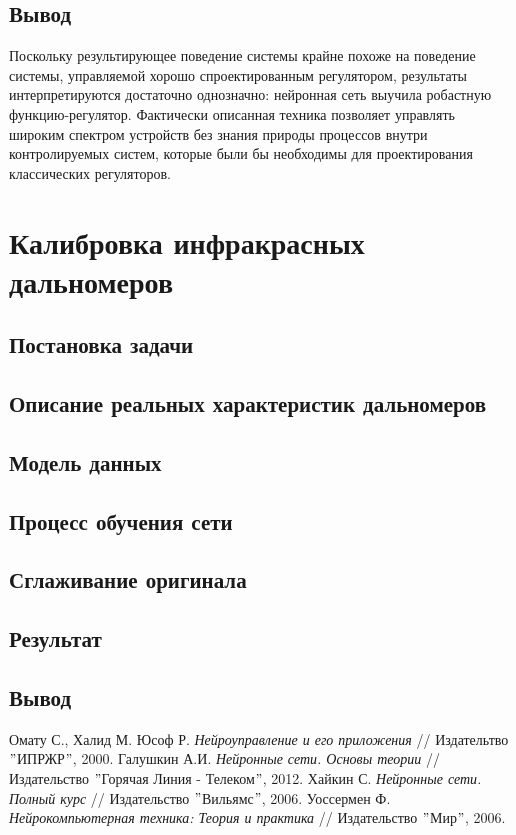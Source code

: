 \documentclass[14pt]{extreport}
\begin{document}
        \section{Вывод}
            Поскольку результирующее поведение системы крайне похоже на поведение системы, управляемой хорошо спроектированным регулятором, результаты интерпретируются достаточно однозначно: нейронная сеть выучила робастную функцию-регулятор. Фактически описанная техника позволяет управлять широким спектром устройств без знания природы процессов внутри контролируемых систем, которые были бы необходимы для проектирования классических регуляторов.
    \chapter{Калибровка инфракрасных дальномеров}
        \section{Постановка задачи}
        \section{Описание реальных характеристик дальномеров}
        \section{Модель данных}
        \section{Процесс обучения сети}
        \section{Сглаживание оригинала}
        \section{Результат}
        \section{Вывод}

\newpage
        \begin{thebibliography}{99}
             Омату С., Халид М. Юсоф Р. {\it Нейроуправление и его приложения} // Издательтво $"$ИПРЖР$"$, 2000.
             Галушкин А.И. {\it Нейронные сети. Основы теории} // Издательство $"$Горячая Линия - Телеком$"$, 2012.
             Хайкин С. {\it Нейронные сети. Полный курс} // Издательство $"$Вильямс$"$, 2006.
             Уоссермен Ф. {\it Нейрокомпьютерная техника: Теория и практика} // Издательство $"$Мир$"$, 2006.
        \end{thebibliography}
\end{document}
